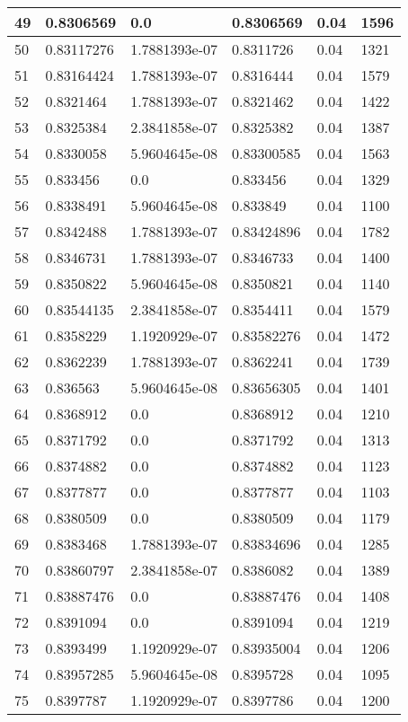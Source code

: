 \begin{longtable}{|l|l|l|l|l|l|}
49 & 0.8306569 & 0.0 & 0.8306569 & 0.04 & 1596 \\ \hline 
50 & 0.83117276 & 1.7881393e-07 & 0.8311726 & 0.04 & 1321 \\ \hline 
51 & 0.83164424 & 1.7881393e-07 & 0.8316444 & 0.04 & 1579 \\ \hline 
52 & 0.8321464 & 1.7881393e-07 & 0.8321462 & 0.04 & 1422 \\ \hline 
53 & 0.8325384 & 2.3841858e-07 & 0.8325382 & 0.04 & 1387 \\ \hline 
54 & 0.8330058 & 5.9604645e-08 & 0.83300585 & 0.04 & 1563 \\ \hline 
55 & 0.833456 & 0.0 & 0.833456 & 0.04 & 1329 \\ \hline 
56 & 0.8338491 & 5.9604645e-08 & 0.833849 & 0.04 & 1100 \\ \hline 
57 & 0.8342488 & 1.7881393e-07 & 0.83424896 & 0.04 & 1782 \\ \hline 
58 & 0.8346731 & 1.7881393e-07 & 0.8346733 & 0.04 & 1400 \\ \hline 
59 & 0.8350822 & 5.9604645e-08 & 0.8350821 & 0.04 & 1140 \\ \hline 
60 & 0.83544135 & 2.3841858e-07 & 0.8354411 & 0.04 & 1579 \\ \hline 
61 & 0.8358229 & 1.1920929e-07 & 0.83582276 & 0.04 & 1472 \\ \hline 
62 & 0.8362239 & 1.7881393e-07 & 0.8362241 & 0.04 & 1739 \\ \hline 
63 & 0.836563 & 5.9604645e-08 & 0.83656305 & 0.04 & 1401 \\ \hline 
64 & 0.8368912 & 0.0 & 0.8368912 & 0.04 & 1210 \\ \hline 
65 & 0.8371792 & 0.0 & 0.8371792 & 0.04 & 1313 \\ \hline 
66 & 0.8374882 & 0.0 & 0.8374882 & 0.04 & 1123 \\ \hline 
67 & 0.8377877 & 0.0 & 0.8377877 & 0.04 & 1103 \\ \hline 
68 & 0.8380509 & 0.0 & 0.8380509 & 0.04 & 1179 \\ \hline 
69 & 0.8383468 & 1.7881393e-07 & 0.83834696 & 0.04 & 1285 \\ \hline 
70 & 0.83860797 & 2.3841858e-07 & 0.8386082 & 0.04 & 1389 \\ \hline 
71 & 0.83887476 & 0.0 & 0.83887476 & 0.04 & 1408 \\ \hline 
72 & 0.8391094 & 0.0 & 0.8391094 & 0.04 & 1219 \\ \hline 
73 & 0.8393499 & 1.1920929e-07 & 0.83935004 & 0.04 & 1206 \\ \hline 
74 & 0.83957285 & 5.9604645e-08 & 0.8395728 & 0.04 & 1095 \\ \hline 
75 & 0.8397787 & 1.1920929e-07 & 0.8397786 & 0.04 & 1200 \\ \hline 
\end{longtable}